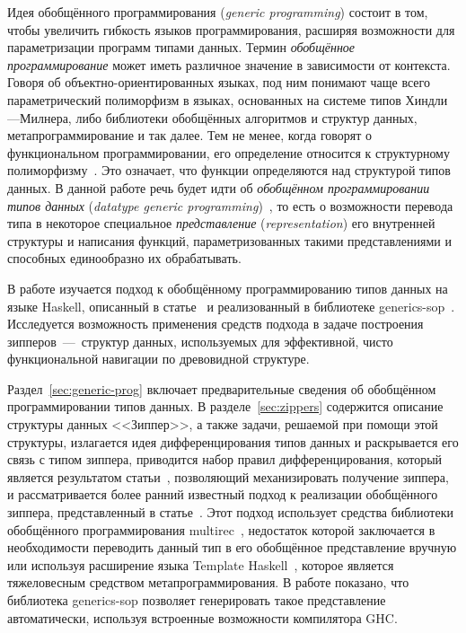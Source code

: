 





\Intro

Идея обобщённого программирования (\textsl{generic programming})
состоит в том, чтобы увеличить гибкость языков программирования,
расширяя возможности для параметризации программ типами данных.
Термин \emph{обобщённое программирование} может иметь различное значение в зависимости от контекста. Говоря об
объектно-ориентированных языках, под ним понимают чаще всего
параметрический полиморфизм в языках, основанных на системе типов
Хиндли---Милнера, либо библиотеки обобщённых алгоритмов и
структур данных, метапрограммирование и так далее. Тем не менее,
когда говорят о функциональном программировании, его определение
относится к структурному полиморфизму~\cite{Loh2004}. Это
означает, что функции определяются над структурой типов данных. В
данной работе речь будет идти об \emph{обобщённом
программировании типов данных} (\textsl{datatype generic
programming})~\cite{Gib2007}, то есть о возможности перевода типа
в некоторое специальное \emph{представление}
(\textsl{representation}) его внутренней структуры и написания
функций, параметризованных такими представлениями и способных
единообразно их обрабатывать.

В работе изучается подход к обобщённому программированию типов
данных на языке Haskell, описанный в статье~\cite{VriLoh2014} и
реализованный в библиотеке \textsf{generics-sop}~\cite{generics-sop}.
Исследуется возможность применения средств подхода в задаче
построения зипперов~---~структур данных, используемых для
эффективной, чисто функциональной навигации по древовидной
структуре.

Раздел~\ref{sec:generic-prog} включает предварительные сведения об
обобщённом программировании типов данных. В
разделе~\ref{sec:zippers} содержится описание структуры данных
<<Зиппер>>, а также задачи, решаемой при помощи этой структуры,
излагается идея дифференцирования типов данных и раскрывается его
связь с типом зиппера, приводится набор правил дифференцирования,
который является результатом статьи~\cite{McBr2001}, позволяющий
механизировать получение зиппера, и рассматривается более ранний
известный подход к реализации обобщённого зиппера,
представленный в статье~\cite{MuRec2009}. Этот подход использует
средства библиотеки обобщённого программирования
\textsf{multirec}~\cite{multirec}, недостаток которой заключается в
необходимости переводить данный тип в его обобщённое
представление вручную или используя расширение языка
\textsf{Template Haskell}~\cite{multirec-th}, которое является
тяжеловесным средством метапрограммирования. В работе показано,
что библиотека \textsf{generics-sop} позволяет генерировать такое
представление автоматически, используя встроенные возможности
компилятора \textsf{GHC}.

